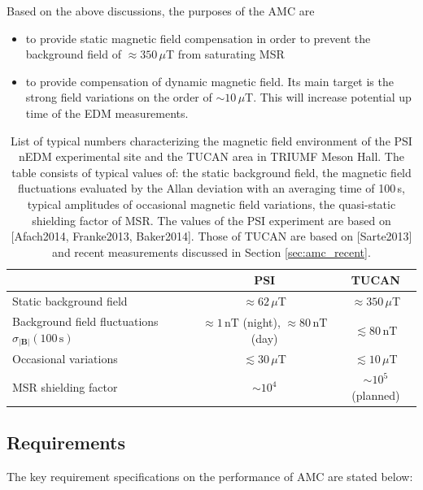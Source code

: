 Based on the above discussions, the purposes of the AMC are 
\begin{itemize}
    \item to provide static magnetic field compensation in order to prevent the background field of $\approx 350\,\mu$T from saturating MSR 
    \item to provide compensation of dynamic magnetic field. Its main target is the strong field variations on the order of $\sim 10\,\mu$T. This will increase potential up time of the EDM measurements. 
\end{itemize}

\begin{table}[hbt]
\centering 
\begin{tabular}{|l||c|c|}
\hline

 & \multicolumn{1}{c|}{\textbf{PSI}} & \multicolumn{1}{c|}{\textbf{TUCAN}} \\ \hline\hline 
Static background field  & $\approx62\,\mu$T & $\approx 350\,\mu$T                       \\ \hline
Background field fluctuations  $\sigma_{|\mathbf{B}|}(100\,\mathrm{s})$ & $\approx 1\,\mathrm{nT}$ (night), $\approx 80\,\mathrm{nT}$ (day) & $\lesssim 80\,\mathrm{nT}$ \\ \hline
Occasional variations    & $\lesssim30\,\mu$T   & $\lesssim 10\,\mu$T            \\ \hline
 MSR shielding  factor       &    $\sim 10^4$   &   $\sim 10^5$ (planned)  \\ \hline 
\end{tabular}
\caption{List of typical numbers characterizing the magnetic field environment of the PSI nEDM experimental site and the TUCAN area in TRIUMF Meson Hall. The table consists of typical values of: the static background field, the magnetic field fluctuations evaluated by the Allan deviation with an averaging time of 100\,s, typical amplitudes of occasional magnetic field variations, the quasi-static shielding factor of MSR. The values of the PSI experiment are based on [Afach2014, Franke2013, Baker2014]. Those of TUCAN are based on [Sarte2013] and recent measurements discussed in Section \ref{sec:amc_recent}. 
}
\label{tab:amc_comparaion}
\end{table}


\subsection{Requirements}
The key requirement specifications on the performance of AMC are stated below:

